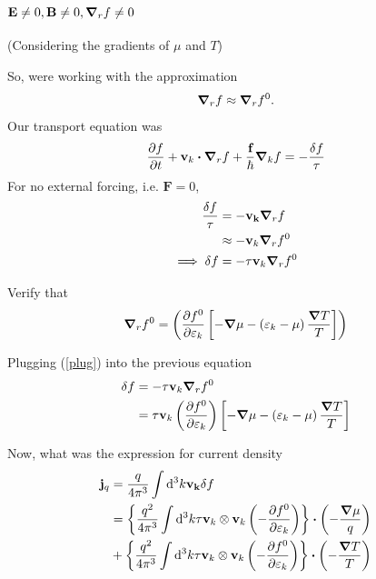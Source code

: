 \documentclass[a4paper]{article}
\newcommand{\hcut}{\hbar}
\begin{document}
\subsubsection*{$\textbf{E} \neq  0, \mathbf{B} \neq 0, \grad_r f \neq 0 $}
\begin{centering}
	(Considering the gradients of $\mu$ and $T$)
\end{centering}
So, were working with the approximation \[
\grad_r f \approx \grad_r f^{0}
.\] 
Our transport equation was
\begin{equation}
	\pdv{f}{t} + \mathbf{v}_k\vdot\grad_r f + \frac{\textbf{f}}{\hcut}
	\grad_k f = -\frac{\delta f}{\tau}
\end{equation}
For no external forcing, i.e. $ \mathbf{F} = 0$,
\begin{equation}
	\begin{split}
		\frac{\delta f}{\tau} &= - \mathbf{v_k}\grad_r f\\
			&\approx - \mathbf{v}_k \grad_r	f^{0}\\
			\implies \delta f &= -\tau \mathbf{v}_k \grad_r f^{0}
	\end{split}
\end{equation}	

Verify that  %
\begin{equation}
	\label{plug}
	\grad_r f^{0} = \left( \pdv{f^{0}}{\varepsilon_k}\left[ -\grad\mu - \left( \varepsilon_k - \mu \right) \frac{\grad T}{T} \right]  \right) 
\end{equation}

Plugging (\ref{plug}) into the previous equation
\begin{equation}
	\begin{split}
		\delta f &= -\tau \mathbf{v}_k \grad_r f^{0} \\
			 &=  \tau \mathbf{v}_k\left( \pdv{f^{0}}{\varepsilon_k} \right) \left[ -\grad\mu - \left( \varepsilon_k - \mu \right) \frac{\grad T}{T} \right] 
	\end{split}
\end{equation}

Now, what was the expression for current density
\begin{equation}
	\begin{split}
		\mathbf{j}_q &= \frac{q}{4\pi^3}\int \dd ^3 k \mathbf{v_k} \delta f \\
			     &= \left\{ \frac{q^2}{4\pi^3}\int \dd ^3 k \tau \mathbf{v}_k \otimes \mathbf{v}_k \left( -\pdv{f^{0}}{\varepsilon_k} \right) \right\} \vdot \left( -\frac{\grad \mu}{q} \right)  \\
			     &+ \left\{ \frac{q^2}{4\pi^3}\int \dd ^3 k \tau \mathbf{v}_k \otimes \mathbf{v}_k \left( -\pdv{f^{0}}{\varepsilon_k} \right) \right\}\vdot \left( -\frac{\grad T}{T} \right)
	\end{split}
\end{equation}
\end{document}
